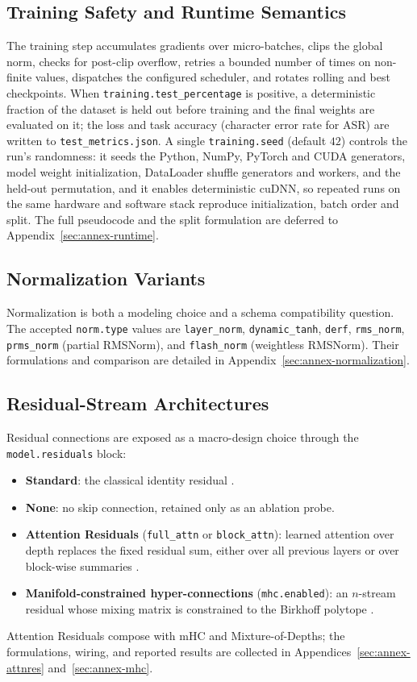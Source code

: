 \subsection{Training Safety and Runtime Semantics}

The training step accumulates gradients over micro-batches, clips the global norm, checks for post-clip overflow, retries a bounded number of times on non-finite values, dispatches the configured scheduler, and rotates rolling and best checkpoints. When \texttt{training.test\_percentage} is positive, a deterministic fraction of the dataset is held out before training and the final weights are evaluated on it; the loss and task accuracy (character error rate for ASR) are written to \texttt{test\_metrics.json}. A single \texttt{training.seed} (default \(42\)) controls the run's randomness: it seeds the Python, NumPy, PyTorch and CUDA generators, model weight initialization, DataLoader shuffle generators and workers, and the held-out permutation, and it enables deterministic cuDNN, so repeated runs on the same hardware and software stack reproduce initialization, batch order and split. The full pseudocode and the split formulation are deferred to Appendix~\ref{sec:annex-runtime}.

\subsection{Normalization Variants}
\label{sec:normalization}

Normalization is both a modeling choice and a schema compatibility question. The accepted \texttt{norm.type} values are \texttt{layer\_norm}, \texttt{dynamic\_tanh}, \texttt{derf}, \texttt{rms\_norm}, \texttt{prms\_norm} (partial RMSNorm), and \texttt{flash\_norm} (weightless RMSNorm). Their formulations and comparison are detailed in Appendix~\ref{sec:annex-normalization}.

\subsection{Residual-Stream Architectures}
\label{sec:residual-stream}

Residual connections are exposed as a macro-design choice through the \texttt{model.residuals} block:
\begin{itemize}[leftmargin=*]
    \item \textbf{Standard}: the classical identity residual \citep{he_deep_2016}.
    \item \textbf{None}: no skip connection, retained only as an ablation probe.
    \item \textbf{Attention Residuals} (\texttt{full\_attn} or \texttt{block\_attn}): learned attention over depth replaces the fixed residual sum, either over all previous layers or over block-wise summaries \citep{sun_attnres_2026}.
    \item \textbf{Manifold-constrained hyper-connections} (\texttt{mhc.enabled}): an $n$-stream residual whose mixing matrix is constrained to the Birkhoff polytope \citep{xie_mhc_2025}.
\end{itemize}

Attention Residuals compose with mHC and Mixture-of-Depths; the formulations, wiring, and reported results are collected in Appendices~\ref{sec:annex-attnres} and~\ref{sec:annex-mhc}.
